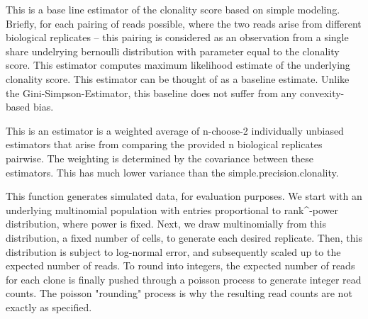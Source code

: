 \documentclass[letterpaper]{book}
\begin{document}
%
\begin{Value}





\begin{ldescription}
\item[\code{simple.precision.clonality}] This is a base line estimator of the clonality score based on simple modeling. Briefly, for each pairing of reads possible, where the two reads arise from different biological replicates -- this pairing is considered as an observation from a single share undelrying bernoulli distribution with parameter equal to the clonality score. This estimator computes maximum likelihood estimate of the underlying clonality score. This estimator can be thought of as a baseline estimate. Unlike the Gini-Simpson-Estimator, this baseline does not suffer from any convexity-based bias.
\item[\code{rao.blackwell.mvg.clonality}] This is an estimator is a weighted average of n-choose-2 individually unbiased estimators that arise from comparing the provided n biological replicates pairwise. The weighting is determined by the covariance between these estimators. This has much lower variance than the simple.precision.clonality.
\end{ldescription}
\end{Value}
%
\begin{Examples}
\end{Examples}
%
\begin{Description}\relax

This function generates simulated data, for evaluation purposes. We start with an underlying multinomial population with entries proportional to rank\textasciicircum{}-power distribution, where power is fixed. Next, we draw multinomially from this distribution, a fixed number of cells, to generate each desired replicate. Then, this distribution is subject to log-normal error, and subsequently scaled up to the expected number of reads. To round into integers, the expected number of reads for each clone is finally pushed through a poisson process to generate integer read counts. The poisson "rounding" process is why the resulting read counts are not exactly as specified.
\end{Description}
\end{document}
